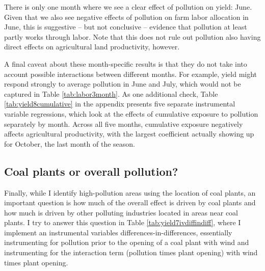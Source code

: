 \documentclass[
]{article}
\begin{document}
There is only one month where we see a clear effect of pollution on yield: June. Given that we also see negative effects of pollution on farm labor allocation in June, this is suggestive -- but not conclusive -- evidence that pollution at least partly works through labor. Note that this does not rule out pollution also having direct effects on agricultural land productivity, however.

A final caveat about these month-specific results is that they do not take into account possible interactions between different months. For example, yield might respond strongly to average pollution in June and July, which would not be captured in Table \ref{tab:labor3month}. As one additional check, Table \ref{tab:yield8cumulative} in the appendix presents five separate instrumental variable regressions, which look at the effects of cumulative exposure to pollution separately by month. Across all five months, cumulative exposure negatively affects agricultural productivity, with the largest coefficient actually showing up for October, the last month of the season.

\hypertarget{coal-plants-or-overall-pollution}{%
\subsection{Coal plants or overall pollution?}\label{coal-plants-or-overall-pollution}}

Finally, while I identify high-pollution areas using the location of coal plants, an important question is how much of the overall effect is driven by coal plants and how much is driven by other polluting industries located in areas near coal plants. I try to answer this question in Table \ref{tab:yield7ivdiffindiff}, where I implement an instrumental variables differences-in-differences, essentially instrumenting for pollution prior to the opening of a coal plant with wind and instrumenting for the interaction term (pollution times plant opening) with wind times plant opening.
\end{document}
